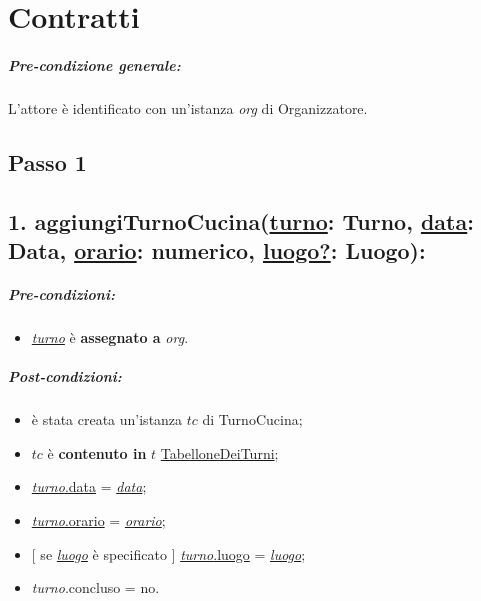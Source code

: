 \chapter{Contratti}
\paragraph{Pre-condizione generale:} L'attore è identificato con un'istanza \textit{org} di Organizzatore.

\section{Passo 1}
\section*{1. aggiungiTurnoCucina(\underline{turno}: Turno,  \underline{data}: Data, \underline{orario}: numerico, \underline{luogo?}: Luogo):}

\paragraph{Pre-condizioni:}

\begin{itemize}
  \item \underline{\textit{turno}} è \textbf{assegnato a} {\textit{org}}.
\end{itemize}

\paragraph{Post-condizioni:}

\begin{itemize}
    \item è stata creata un'istanza $tc$ di TurnoCucina;
    \item $tc$ è \textbf{contenuto in} $t$ \underline{TabelloneDeiTurni};
    \item \underline{\textit{turno}.data} = \underline{\textit{data}};
    
    \item \underline{\textit{turno}.orario} = \underline{\textit{orario}};
    \item $[$ se \underline{\textit{luogo}} è specificato $]$ \underline{\textit{turno}.luogo} = \underline{\textit{luogo}};
    \item \textit{turno}.concluso  = no.
\end{itemize}

